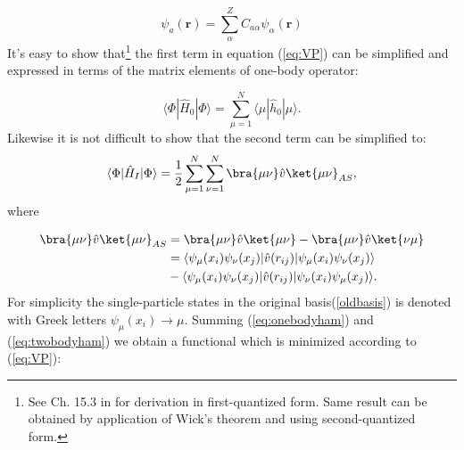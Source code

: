 \documentclass[twoside,english]{uiofysmaster}
\begin{document}
\begin{equation}\label{oldbasis}
\psi_a(\boldsymbol{r}) = \sum_{\alpha}^{Z} C_{a\alpha}\psi_\alpha(\boldsymbol{r})
\end{equation}
It's easy to show that\footnote{See Ch. 15.3 in \cite{Hjorth-JensenComputationalPhysicsLecture2015} for derivation in first-quantized form. Same result can be obtained by application of Wick's theorem and using second-quantized form\cite{S.KvaalLectureNotesFysKjm44802015}.} the first term in equation (\ref{eq:VP}) can be simplified and expressed in terms of the matrix elements of one-body operator:

\begin{equation}
\langle \Phi|\hat{H}_0|\Phi\rangle  = \sum_{\mu=1}^N \langle \mu | \hat{h}_0 | \mu \rangle.
\label{eq:onebodyham}
\end{equation}
Likewise it is not difficult to show that the second term can be simplified to:
\begin{align}\label{eq:twobodyham}
\begin{split}
\langle \Phi|\hat{H}_I|\Phi\rangle = \frac{1}{2}\sum_{\mu=1}^N\sum_{\nu=1}^N \bra{\mu \nu}\hat{v}\ket{\mu \nu}_{AS},
\end{split}
\end{align}
where

\begin{align*}
	\bra{\mu \nu}\hat{v}\ket{\mu \nu}_{AS} &= \bra{\mu \nu}\hat{v}\ket{\mu \nu} - \bra{\mu \nu}\hat{v}\ket{\nu \mu } 
	\\ &=\langle \psi_{\mu}(x_i)\psi_{\nu}(x_j)|\hat{v}(r_{ij})|\psi_{\mu}(x_i)\psi_{\nu}(x_j)\rangle\\&-\langle\psi_{\mu}(x_i)\psi_{\nu}(x_j)|\hat{v}(r_{ij})|\psi_{\nu}(x_i)\psi_{\mu}(x_j)\rangle.
\end{align*}
For simplicity the single-particle states in the original basis(\ref{oldbasis}) is denoted with Greek letters $\psi_{\mu}(x_i) \rightarrow \mu$. Summing (\ref{eq:onebodyham}) and (\ref{eq:twobodyham}) we obtain a functional which is minimized according to (\ref{eq:VP}):
\end{document}
